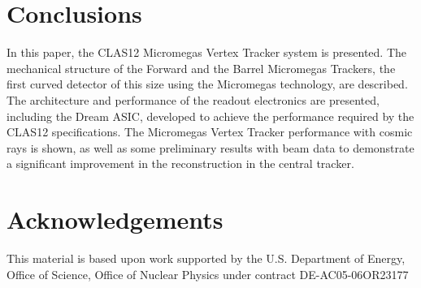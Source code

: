 \section{Conclusions}

In this paper, the CLAS12 Micromegas Vertex Tracker system is presented. The mechanical structure of the
Forward and the Barrel Micromegas Trackers, the first curved detector of this size using the Micromegas technology,
are described. The architecture and performance of the readout electronics are presented, including the Dream ASIC,
developed to achieve the performance required by the CLAS12 specifications. The Micromegas Vertex Tracker
performance with cosmic rays is shown, as well as some preliminary results with beam data to demonstrate a significant
improvement in the reconstruction in the central tracker.

\section{Acknowledgements}


This material is based upon work supported by the U.S. Department of Energy, Office of Science, Office of Nuclear 
Physics under contract DE-AC05-06OR23177